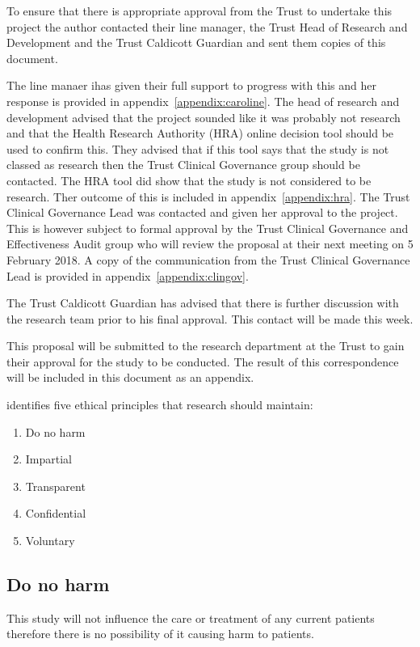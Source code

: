 \documentclass
[
	12pt,
	a4paper,
	oneside,
]{article}
\begin{document}
To ensure that there is appropriate approval from the Trust to undertake this project
the author contacted their line manager, the Trust Head of Research and Development and
the Trust Caldicott Guardian and sent them copies of this document. 

The line manaer ihas given their full support to progress with this and her response 
is provided in appendix~\ref{appendix:caroline}. The head of research and development
advised that the project sounded like it was probably not research and that 
the Health Research Authority (HRA) online decision tool should be used to confirm this.
They advised that if this tool says that the study is not classed as research then
the Trust Clinical Governance group should be contacted. The HRA tool did show
that the study is not considered to be research. Ther outcome of this is included
in appendix~\ref{appendix:hra}. The Trust Clinical Governance Lead was contacted
and given her approval to the project. This is however subject to formal approval
by the Trust Clinical Governance and Effectiveness Audit group who will review 
the proposal at their next meeting on 5 February 2018. A copy of the communication
from the Trust Clinical Governance Lead is provided in appendix~\ref{appendix:clingov}.

The Trust Caldicott Guardian has advised that there is further discussion with 
the research team prior to his final approval. This contact will be made this week.

This proposal will be submitted to the research department at the Trust to gain 
their approval for the study to be conducted. The result of this correspondence 
will be included in this document as an appendix.

\textcite{biggam:15} identifies five ethical principles that research should maintain:
\begin{enumerate}
\item Do no harm
\item Impartial
\item Transparent
\item Confidential
\item Voluntary
\end{enumerate}

\subsection{Do no harm}
This study will not influence the care or treatment of any current patients therefore
there is no possibility of it causing harm to patients.
\end{document}
